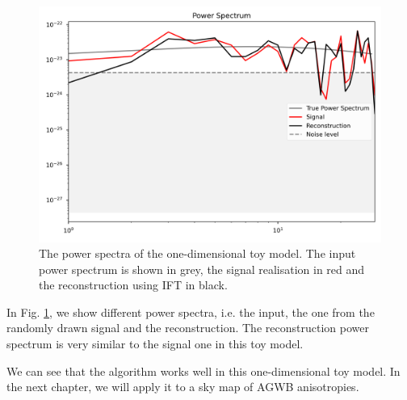 \begin{figure}[h]
    \centering
    \includegraphics[width=0.7\linewidth]{Images/power_spectrum_400Hz_1D.png}
    \caption[The power spectra of the one-dimensional toy model.]{The power spectra of the one-dimensional toy model. The input power spectrum is shown in grey, the signal realisation in red and the reconstruction using IFT in black.}
    \label{1D_power_spectrum}
\end{figure} 

In Fig. \ref{1D_power_spectrum}, we show different power spectra, i.e. the input, the one from the randomly drawn signal and the reconstruction. The reconstruction power spectrum is very similar to the signal one in this toy model.

We can see that the algorithm works well in this one-dimensional toy model. In the next chapter, we will apply it to a sky map of AGWB anisotropies.
